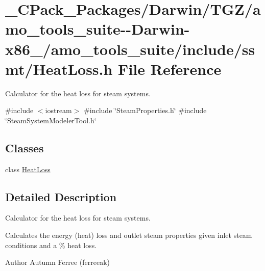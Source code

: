 \hypertarget{___c_pack___packages_2_darwin_2_t_g_z_2amo__tools__suite--_darwin-x86__64_2amo__tools__suite_2include_2ssmt_2_heat_loss_8h}{}\section{\+\_\+\+C\+Pack\+\_\+\+Packages/\+Darwin/\+T\+G\+Z/amo\+\_\+tools\+\_\+suite-\/-\/\+Darwin-\/x86\+\_/amo\+\_\+tools\+\_\+suite/include/ssmt/\+Heat\+Loss.h File Reference}
\label{___c_pack___packages_2_darwin_2_t_g_z_2amo__tools__suite--_darwin-x86__64_2amo__tools__suite_2include_2ssmt_2_heat_loss_8h}


Calculator for the heat loss for steam systems.  


{\ttfamily \#include $<$iostream$>$}\newline
{\ttfamily \#include \char`\"{}Steam\+Properties.\+h\char`\"{}}\newline
{\ttfamily \#include \char`\"{}Steam\+System\+Modeler\+Tool.\+h\char`\"{}}\newline
\subsection*{Classes}
\begin{DoxyCompactItemize}
\item 
class \hyperlink{class_heat_loss}{Heat\+Loss}
\end{DoxyCompactItemize}


\subsection{Detailed Description}
Calculator for the heat loss for steam systems. 

Calculates the energy (heat) loss and outlet steam properties given inlet steam conditions and a \% heat loss.

\begin{DoxyAuthor}{Author}
Autumn Ferree (ferreeak) 
\end{DoxyAuthor}
